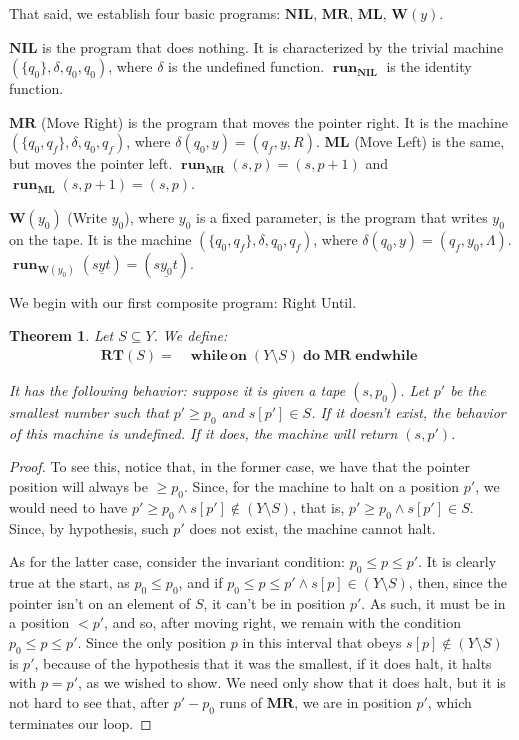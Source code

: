 \documentclass{article}
\newtheorem{theorem}{Theorem}
\DeclareMathOperator{\run}{\mathbf{run}}
\DeclareMathOperator{\Nwhileon}{\mathbf{while\,on}}
\DeclareMathOperator{\Ndo}{\mathbf{do}}
\DeclareMathOperator{\Nendwhile}{\mathbf{endwhile}}
\newcommand{\NIL}{\mathbf{NIL}}
\newcommand{\MR}{\mathbf{MR}}
\newcommand{\ML}{\mathbf{ML}}
\newcommand{\W}{\mathbf{W}}
\newcommand{\RT}{\mathbf{RT}}
\begin{document}
	That said, we establish four basic programs: $\NIL$, $\MR$, $\ML$, $\W(y)$.
	
	$\NIL$ is the program that does nothing. It is characterized by the trivial machine $(\{q_0\}, \delta, q_0, q_0)$, where $\delta$ is the undefined function. $\run_\NIL$ is the identity function.
	
	$\MR$ (Move Right) is the program that moves the pointer right. It is the machine $(\{q_0, q_f\}, \delta, q_0, q_f)$, where $\delta(q_0, y) = (q_f, y, R)$. $\ML$ (Move Left) is the same, but moves the pointer left. $\run_\MR(s,p) = (s, p+1)$ and $\run_\ML(s, p+1) = (s, p)$.
	
	$\W(y_0)$ (Write $y_0$), where $y_0$ is a fixed parameter, is the program that writes $y_0$ on the tape. It is the machine $(\{q_0, q_f\}, \delta, q_0, q_f)$, where $\delta(q_0, y) = (q_f, y_0, \Lambda)$. $\run_{\W(y_0)}(s \underline y t) = (s \underline{y_0} t)$.
	
	We begin with our first composite program: Right Until.
	
	\begin{theorem}
	Let $S \subseteq Y$. We define:
	\begin{align*}
	\RT(S) =& \Nwhileon (Y \setminus S) \Ndo \MR \Nendwhile
	\end{align*}
	
	It has the following behavior: suppose it is given a tape $(s,p_0)$. Let $p'$ be the smallest number such that $p' \geq p_0$ and $s[p'] \in S$. If it doesn't exist, the behavior of this machine is undefined. If it does, the machine will return $(s,p')$.
	\end{theorem}
	
	\begin{proof}
	To see this, notice that, in the former case, we have that the pointer position will always be $\geq p_0$. Since, for the machine to halt on a position $p'$, we would need to have $p' \geq p_0 \land s[p'] \not \in (Y \setminus S)$, that is, $p' \geq p_0 \land s[p'] \in S$. Since, by hypothesis, such $p'$ does not exist, the machine cannot halt.
	
	As for the latter case, consider the invariant condition: $p_0 \leq p \leq p'$. It is clearly true at the start, as $p_0 \leq p_0$, and if $p_0 \leq p \leq p' \land s[p] \in (Y \setminus S)$, then, since the pointer isn't on an element of $S$, it can't be in position $p'$. As such, it must be in a position $<p'$, and so, after moving right, we remain with the condition $p_0 \leq p \leq p'$. Since the only position $p$ in this interval that obeys $s[p] \not \in (Y \setminus S)$ is $p'$, because of the hypothesis that it was the smallest, if it does halt, it halts with $p = p'$, as we wished to show. We need only show that it does halt, but it is not hard to see that, after $p' - p_0$ runs of $\MR$, we are in position $p'$, which terminates our loop.
	\end{proof}
	
\end{document}

